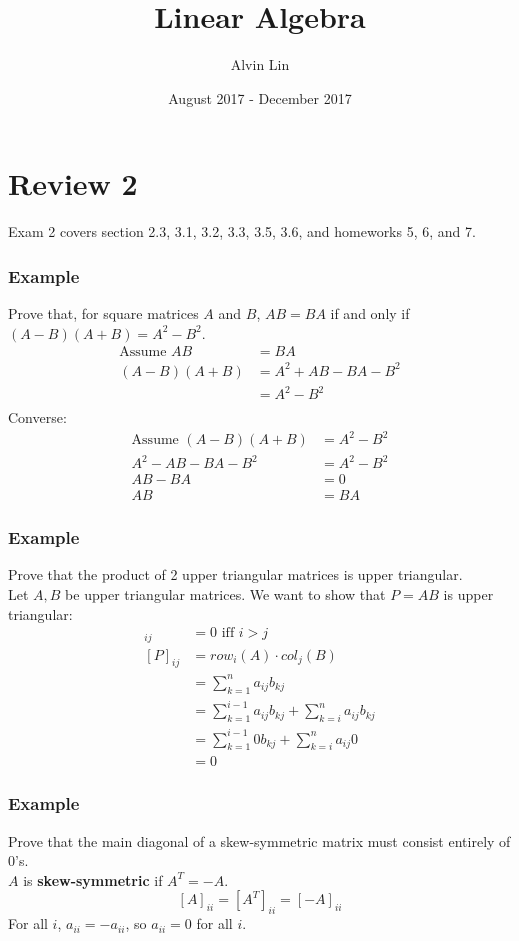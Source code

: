 \documentclass[letterpaper, 12pt]{math}
\title{Linear Algebra}
\author{Alvin Lin}
\date{August 2017 - December 2017}
\begin{document}
\maketitle

\section*{Review 2}
Exam 2 covers section 2.3, 3.1, 3.2, 3.3, 3.5, 3.6, and homeworks 5, 6, and 7.

\subsubsection*{Example}
Prove that, for square matrices \( A \) and \( B \), \( AB = BA \) if and only
if \( (A-B)(A+B) = A^2-B^2 \).
\begin{align*}
  \text{Assume } AB &= BA \\
  (A-B)(A+B) &= A^2+AB-BA-B^2 \\
  &= A^2-B^2 \\
\end{align*}
Converse:
\begin{align*}
  \text{Assume } (A-B)(A+B) &= A^2-B^2 \\
  A^2-AB-BA-B^2 &= A^2-B^2 \\
  AB-BA &= 0 \\
  AB &= BA
\end{align*}

\subsubsection*{Example}
Prove that the product of 2 upper triangular matrices is upper triangular. \\
Let \( A,B \) be upper triangular matrices. We want to show that \( P = AB \)
is upper triangular:
\begin{align*}
  [P]_{ij} &= 0 \text{ iff } i > j \\
  [P]_{ij} &= row_i(A)\cdot col_j(B) \\
  &= \sum_{k=1}^{n}a_{ij}b_{kj} \\
  &= \sum_{k=1}^{i-1}a_{ij}b_{kj}+\sum_{k=i}^{n}a_{ij}b_{kj} \\
  &= \sum_{k=1}^{i-1}0b_{kj}+\sum_{k=i}^{n}a_{ij}0 \\
  &= 0
\end{align*}

\subsubsection*{Example}
Prove that the main diagonal of a skew-symmetric matrix must consist entirely
of 0's. \\
\( A \) is \textbf{skew-symmetric} if \( A^T = -A \).
\[ [A]_{ii} = [A^T]_{ii} = [-A]_{ii} \]
For all \( i \), \( a_{ii} = -a_{ii} \), so \( a_{ii} = 0 \) for all \( i \).
\end{document}
